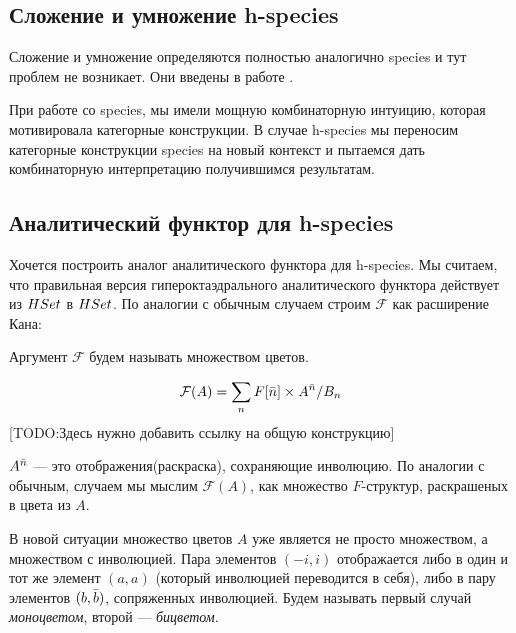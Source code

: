 \subsection{Сложение и умножение h-species}
Сложение и умножение определяются полностью аналогично species и тут проблем не
возникает. Они введены в работе \cite{BergH}.
\begin{remark}
При работе со species, мы имели мощную комбинаторную интуицию, которая
мотивировала категорные конструкции. В случае h-species мы переносим категорные
конструкции species на новый контекст и пытаемся дать комбинаторную
интерпретацию получившимся результатам.
\end{remark}


\subsection{Аналитический функтор для h-species}
Хочется построить аналог аналитического функтора для h-species. Мы считаем, что
правильная версия гипероктаэдрального аналитического функтора действует из
$HSet$ в $HSet$. По аналогии с обычным случаем строим $\mathcal F$ как
расширение Кана:


Аргумент $\mathcal F$ будем называть множеством цветов.

\begin{equation}
\label{eq:h-an}
	\mathcal F(A) = \sum\limits_n F[\Bar n] \times A^{\Bar n} / B_n
\end{equation}
[TODO:Здесь нужно добавить ссылку на общую конструкцию]

$A^{\Bar n}$ --- это отображения(раскраска), сохраняющие инволюцию. По
аналогии с обычным, случаем мы мыслим $\mathcal F(A)$, как множество
$F$-структур, раскрашеных в цвета из $A$.
\begin{remark}
В новой ситуации множество цветов $A$ уже является не просто множеством, а
множеством с инволюцией. Пара элементов $(-i, i)$ отображается либо
в один и тот же элемент $(a, a)$ (который инволюцией переводится в себя), либо
в пару элементов $(b, \Bar b)$, сопряженных инволюцией. Будем называть первый
случай \emph{моноцветом}, второй --- \emph{бицветом}.
\end{remark}

